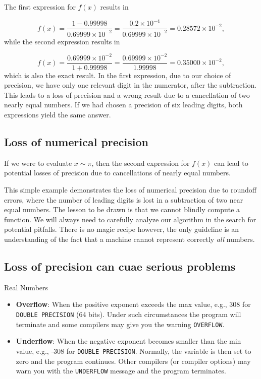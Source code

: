 \documentclass[%
oneside,                 %
final,                   %
10pt]{article}
\begin{document}
The first expression for $f(x)$ results in

\[
   f(x)=\frac{1-0.99998}{0.69999\times 10^{-2}}=\frac{0.2\times 10^{-4}}{0.69999\times 10^{-2}}=0.28572\times 10^{-2},
\]
while the second expression results in

\[
   f(x)=\frac{0.69999\times 10^{-2}}{1+0.99998}=
\frac{0.69999\times 10^{-2}}{1.99998}=0.35000\times 10^{-2},
\]
which is also the exact result. In the first expression, due to our
choice of precision, we have
only one relevant digit in the numerator, after the
subtraction. This leads to a loss of precision and a wrong result due to
a cancellation of two nearly equal numbers.
If we had chosen a precision of six leading digits, both expressions
yield the same answer.

\subsection{Loss of numerical precision}

If we were to evaluate $x\sim \pi$, then the second expression for $f(x)$
can lead to potential losses of precision due to cancellations of nearly
equal numbers.

This simple example demonstrates  the loss of numerical precision due
to roundoff errors, where the number of leading digits is lost
in a subtraction of two near equal numbers.
The lesson to be drawn is that we cannot blindly compute a function.
We will always need to carefully analyze our algorithm in the search for
potential pitfalls. There is no magic recipe however, the only guideline
is an understanding of the fact that a machine cannot represent
correctly \emph{all} numbers.

\subsection{Loss of precision can cuae serious problems}

\begin{block}{Real Numbers }

\begin{itemize}
  \item \textbf{Overflow}: When the positive exponent exceeds the max value, e.g., 308 for \Verb!DOUBLE PRECISION! (64 bits). Under such circumstances the program will terminate and some compilers may give you the warning \Verb!OVERFLOW!.

  \item \textbf{Underflow}: When the negative exponent becomes smaller than the min value, e.g., -308 for \Verb!DOUBLE PRECISION!. Normally, the variable is then set to zero and the program continues. Other compilers (or compiler options) may warn you with the \Verb!UNDERFLOW! message and the program terminates.
\end{itemize}

\noindent
\end{block}
\end{document}
